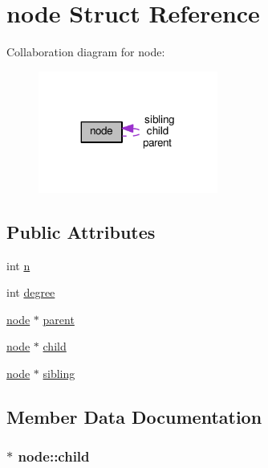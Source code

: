 \hypertarget{structnode}{}\section{node Struct Reference}
\label{structnode}


Collaboration diagram for node\+:
\nopagebreak
\begin{figure}[H]
\begin{center}
\leavevmode
\includegraphics[width=167pt]{structnode__coll__graph}
\end{center}
\end{figure}
\subsection*{Public Attributes}
\begin{DoxyCompactItemize}
\item 
int \hyperlink{structnode_a027ad0e5186d6cfab02c74a3da2d28a9}{n}
\item 
int \hyperlink{structnode_a5ef19e24e48768739e8743eccbc81434}{degree}
\item 
\hyperlink{structnode}{node} $\ast$ \hyperlink{structnode_a5e88137f1d0e2f7a940bccf4c3d3a4d3}{parent}
\item 
\hyperlink{structnode}{node} $\ast$ \hyperlink{structnode_a422bd5292acd3b746c3f3113f76de9a7}{child}
\item 
\hyperlink{structnode}{node} $\ast$ \hyperlink{structnode_a0941f5cd2e8bd7fda70619bb099f267d}{sibling}
\end{DoxyCompactItemize}


\subsection{Member Data Documentation}
\subsubsection[{\texorpdfstring{child}{child}}]{$\ast$ node\+::child}\hypertarget{structnode_a422bd5292acd3b746c3f3113f76de9a7}{}\label{structnode_a422bd5292acd3b746c3f3113f76de9a7}
